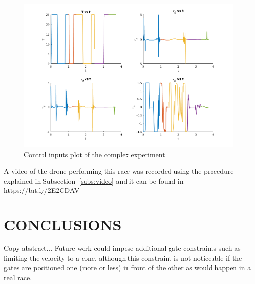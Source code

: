 \documentclass[letterpaper, 10 pt, conference]{ieeeconf}  %
\begin{document}
\begin{figure}[!htpb]
	\centering
	\includegraphics[width=1.0\linewidth]{Images/final_race/controls.png}
	\caption{Control inputs plot of the complex experiment}
	\label{fig:final_controls}
\end{figure}

A video of the drone performing this race was recorded using the procedure explained in Subsection~\ref{subs:video} and it can be found in https://bit.ly/2E2CDAV

\section{CONCLUSIONS}\label{s:conclusions}

Copy abstract... Future work could impose additional gate constraints such as limiting the velocity to a cone, although this constraint is not noticeable if the gates are positioned one (more or less) in front of the other as would happen in a real race.

\addtolength{\textheight}{-12cm}   %


\balance

\makeatletter
\def\endthebibliography{%
	\def\@noitemerr{\@latex@warning{Empty `thebibliography' environment}}%
	\endlist
}
\makeatother



\end{document}
